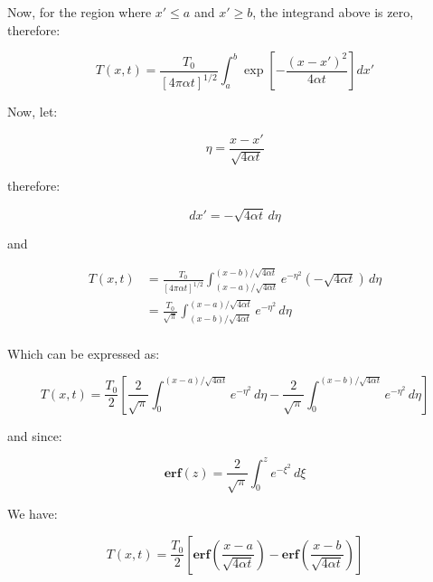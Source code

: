 \documentclass[letterpaper,12pt]{article}
\begin{document}
Now, for the region where $x' \leq a$ and $x' \geq b$, the integrand above is zero, therefore:

\begin{equation}
    T(x, t) = \frac{T_0}{\left[ 4 \pi \alpha t \right]^{1/2}} \int_{a}^{b} \exp{\left[ -\frac{(x - x')^2}{4 \alpha t} \right] dx'}
\end{equation}

Now, let:

\begin{equation}
    \eta = \frac{x - x'}{\sqrt{4 \alpha t}}
\end{equation}

therefore:

\begin{equation}
    dx' = - \sqrt{4 \alpha t} \, d \eta
\end{equation}

and

\begin{equation}
\begin{aligned}
    T(x, t) &= \frac{T_0}{\left[ 4 \pi \alpha t \right]^{1/2}} \int_{(x - a)/\sqrt{4 \alpha t}}^{(x - b)/\sqrt{4 \alpha t}} e^{-\eta^2} \left(- \sqrt{4 \alpha t} \right) \, d \eta \\[6pt]
            &= \frac{T_0}{\sqrt{\pi}} \int_{(x - b)/\sqrt{4 \alpha t}}^{(x - a)/\sqrt{4 \alpha t}} e^{-\eta^2} \, d \eta \\
\end{aligned}
\end{equation}

Which can be expressed as:

\begin{equation}
    T(x, t) = \frac{T_0}{2} \left[ \frac{2}{\sqrt{\pi}} \int_{0}^{(x - a)/\sqrt{4 \alpha t}} e^{- \eta^2} \,  d\eta - \frac{2}{\sqrt{\pi}} \int_{0}^{(x - b)/\sqrt{4 \alpha t}} e^{- \eta^2} \,  d\eta\right]
\end{equation}

and since:

\begin{equation}
    \mathbf{erf}(z) = \frac{2}{\sqrt{\pi}} \int_{0}^{z} e^{- \xi^2} \, d\xi
\end{equation}

We have:

\begin{equation}
    T(x, t) = \frac{T_0}{2} \left[ \mathbf{erf} \left( \frac{x - a}{\sqrt{4 \alpha t}} \right) - \mathbf{erf} \left( \frac{x - b}{\sqrt{4 \alpha t}} \right)\right]
\end{equation}
\end{document}
